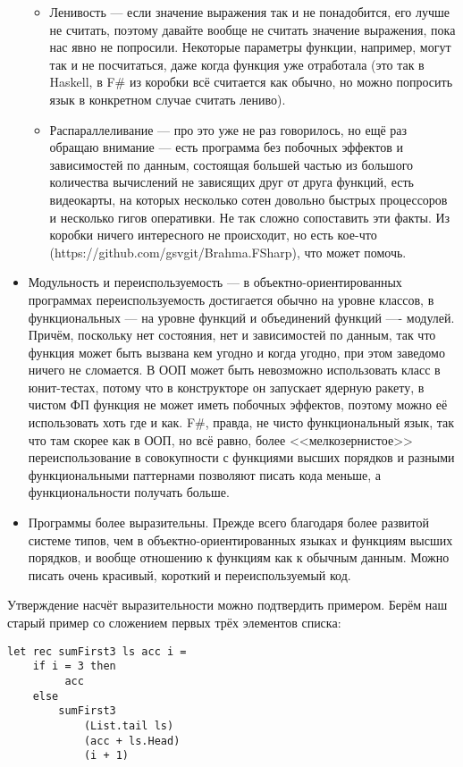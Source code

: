 \documentclass[a5paper]{article}
\begin{document}
\begin{itemize}
	\begin{itemize}
		\item Ленивость --- если значение выражения так и не понадобится, его лучше не считать, поэтому давайте вообще не считать значение выражения, пока нас явно не попросили. Некоторые параметры функции, например, могут так и не посчитаться, даже когда функция уже отработала (это так в Haskell, в F\# из коробки всё считается как обычно, но можно попросить язык в конкретном случае считать лениво).
		\item Распараллеливание --- про это уже не раз говорилось, но ещё раз обращаю внимание --- есть программа без побочных эффектов и зависимостей по данным, состоящая большей частью из большого количества вычислений не зависящих друг от друга функций, есть видеокарты, на которых несколько сотен довольно быстрых процессоров и несколько гигов оперативки. Не так сложно сопоставить эти факты. Из коробки ничего интересного не происходит, но есть кое-что (https://github.com/gsvgit/Brahma.FSharp), что может помочь.
	\end{itemize}
	\item Модульность и переиспользуемость --- в объектно-ориентированных программах переиспользуемость достигается обычно на уровне классов, в функциональных --- на уровне функций и объединений функций ---- модулей. Причём, поскольку нет состояния, нет и зависимостей по данным, так что функция может быть вызвана кем угодно и когда угодно, при этом заведомо ничего не сломается. В ООП может быть невозможно использовать класс в юнит-тестах, потому что в конструкторе он запускает ядерную ракету, в чистом ФП функция не может иметь побочных эффектов, поэтому можно её использовать хоть где и как. F\#, правда, не чисто функциональный язык, так что там скорее как в ООП, но всё равно, более <<мелкозернистое>> переиспользование в совокупности с функциями высших порядков и разными функциональными паттернами позволяют писать кода меньше, а функциональности получать больше.
	\item Программы более выразительны. Прежде всего благодаря более развитой системе типов, чем в объектно-ориентированных языках и функциям высших порядков, и вообще отношению к функциям как к обычным данным. Можно писать очень красивый, короткий и переиспользуемый код.
\end{itemize}

Утверждение насчёт выразительности можно подтвердить примером. Берём наш старый пример со сложением первых трёх элементов списка:
\begin{verbatim}
let rec sumFirst3 ls acc i =
    if i = 3 then 
         acc 
    else 
        sumFirst3 
            (List.tail ls) 
            (acc + ls.Head) 
            (i + 1)
\end{verbatim}
\end{document}
